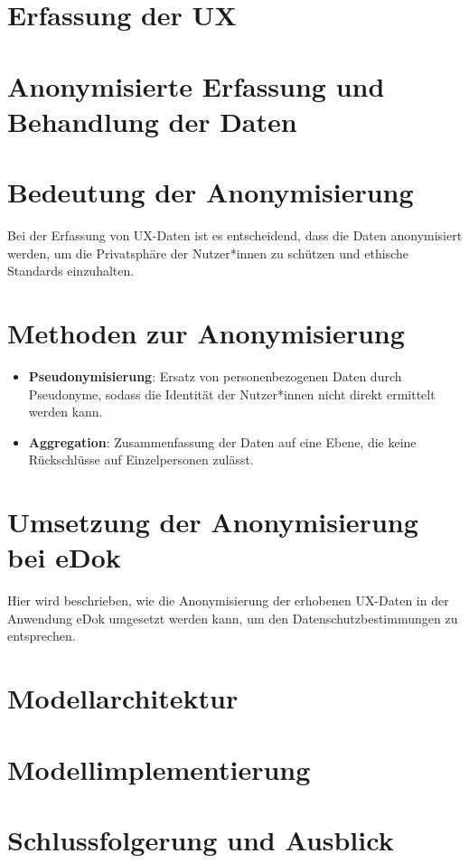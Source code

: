 \documentclass[12pt,oneside]{article}
\begin{document}
\section{Erfassung der UX}
\section{Anonymisierte Erfassung und Behandlung der Daten}
\section{Bedeutung der Anonymisierung}
Bei der Erfassung von UX-Daten ist es entscheidend, dass die Daten anonymisiert werden, um die Privatsphäre der Nutzer*innen zu schützen und ethische Standards einzuhalten.
\section{Methoden zur Anonymisierung}
\begin{itemize}
\item \textbf{Pseudonymisierung}: Ersatz von personenbezogenen Daten durch Pseudonyme, sodass die Identität der Nutzer*innen nicht direkt ermittelt werden kann.
\item \textbf{Aggregation}: Zusammenfassung der Daten auf eine Ebene, die keine Rückschlüsse auf Einzelpersonen zulässt.
\end{itemize}
\section{Umsetzung der Anonymisierung bei eDok}
Hier wird beschrieben, wie die Anonymisierung der erhobenen UX-Daten in der Anwendung eDok umgesetzt werden kann, um den Datenschutzbestimmungen zu entsprechen.
\section{Modellarchitektur}
 
\section{Modellimplementierung}
 
\section{Schlussfolgerung und Ausblick}
 
 
 
  
\printbibliography
 
\end{document}
